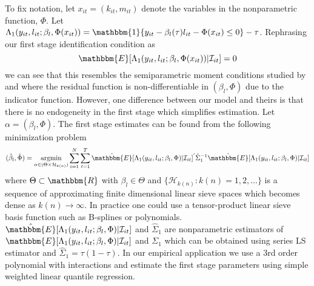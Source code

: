 \documentclass[11pt]{article}
\begin{document}
To fix notation, let $x_{it}=(k_{it}, m_{it})$ denote the variables in the nonparametric function, $\Phi$. Let $\Lambda_{1}(y_{it}, l_{it}; \beta_{l}, \Phi(x_{it}))=\mathbbm{1}\{y_{it}-\beta_{l}(\tau)l_{it}-\Phi(x_{it})\leq 0\}-\tau$. Rephrasing our first stage identification condition as 
\begin{equation} \label{residual}
\mathbbm{E}[\Lambda_{1}(y_{it}, l_{it}; \beta_{l}, \Phi(x_{it}))|\mathcal{I}_{it}]=0
\end{equation}
we can see that this resembles the semiparametric moment conditions studied by \cite{Chen2009} and \cite{Ai2012} where the residual function is non-differentiable in $(\beta_{l}, \Phi)$ due to the indicator function. However, one difference between our model and theirs is that there is no endogeneity in the first stage which simplifies estimation. Let $\alpha=(\beta_{l}, \Phi)$. The first stage estimates can be found from the following minimization problem
\begin{equation}
(\hat{\beta}_{l}, \hat{\Phi})=\underset{\alpha\in(\Theta\times \mathcal{H}_{k(n)})}{\operatorname{argmin}}\sum_{i=1}^{N}\sum_{t=1}^{T}\hat{\mathbbm{E}}[\Lambda_{1}(y_{it}, l_{it}; \beta_{l}, \Phi)|\mathcal{I}_{it}]^{'}\hat{\Sigma}_{1}^{-1}\hat{\mathbbm{E}}[\Lambda_{1}(y_{it}, l_{it}; \beta_{l}, \Phi)|\mathcal{I}_{it}]
\end{equation}
where $\Theta\subset \mathbbm{R}$ with $\beta_{l}\in\Theta$ and $\{\mathcal{H}_{k(n)}: k(n)=1,2,\dots\}$ is a sequence of approximating finite dimensional linear sieve spaces which becomes dense as $k(n)\rightarrow \infty$. In practice one could use a tensor-product linear sieve basis function such as B-splines or polynomials. $\hat{\mathbbm{E}}[\Lambda_{1}(y_{it}, l_{it}; \beta_{l}, \Phi)|\mathcal{I}_{it}]$ and $\hat{\Sigma}_{1}$ are nonparametric estimators of $\mathbbm{E}[\Lambda_{1}(y_{it}, l_{it}; \beta_{l}, \Phi)|\mathcal{I}_{it}]$ and $\Sigma_{1}$ which can be obtained using series LS estimator and $\hat{\Sigma}_{1}=\tau(1-\tau)$. In our empirical application we use a 3rd order polynomial with interactions and estimate the first stage parameters using simple weighted linear quantile regression.
\end{document}
